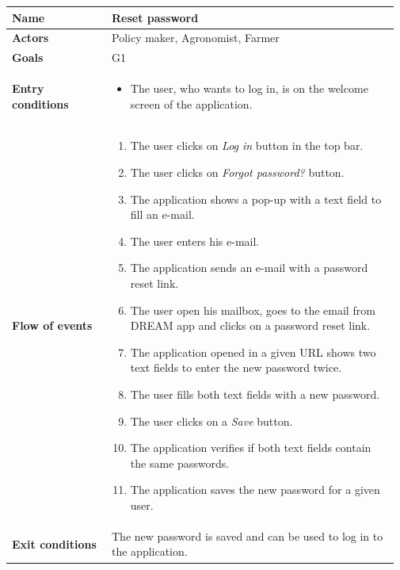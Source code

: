 \begin{table}[H]
    \centering
	\begin{tabular}{@{}p{0.25\linewidth} p{0.72\linewidth}@{}}
\toprule
		\textbf{Name}               & Reset password\\
		\midrule
		\textbf{Actors}             & Policy maker, Agronomist, Farmer\\
		\midrule
		\textbf{Goals}              & G1 \\
		\midrule
		
		\textbf{Entry conditions}   & \begin{itemize}[leftmargin=.4cm,noitemsep,topsep=0pt,before=\vspace{-3mm},after=\vspace{-4mm}]
		    \item The user, who wants to log in, is on the welcome screen of the application.
		\end{itemize}\\
		\midrule
		
		\textbf{Flow of events}     & \begin{enumerate}[leftmargin=.4cm,noitemsep,topsep=0pt,before=\vspace{-3mm},after=\vspace{-4mm}]
		    \item The user clicks on \textit{Log in} button in the top bar.
		    \item The user clicks on \textit{Forgot password?} button.
		    \item The application shows a pop-up with a text field to fill an e-mail.
		    \item The user enters his e-mail.
		    \item The application sends an e-mail with a password reset link.
		    \item The user open his mailbox, goes to the email from DREAM app and clicks on a password reset link.
		    \item The application opened in a given URL shows two text fields to enter the new password twice.
		    \item The user fills both text fields with a new password.
		    \item The user clicks on a \textit{Save} button.
		    \item The application verifies if both text fields contain the same passwords.
		    \item The application saves the new password for a given user.
		\end{enumerate}\\
		\midrule
		\textbf{Exit conditions}    & The new password is saved and can be used to log in to the application.
		\\ \midrule
		

\end{tabular}
\end{table}
